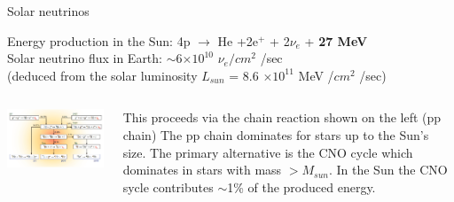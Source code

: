 \begin{frame}[t]{Solar neutrinos}
\begin{center}
Energy production in the Sun:  {\color{red} 4p $\rightarrow$ He
  +2e$^{+}$ + 2$\nu_{e}$} + {\bf \color{blue} 27 MeV}\\
    Solar neutrino flux in Earth: {\color{red}$\sim$6$\times10^{10}$ $\nu_{e} /cm^{2}$ /sec}\\
   (deduced from the solar luminosity $L_{sun}$ = 8.6 $\times 10^{11}$ MeV /$cm^{2}$ /sec)\\
\end{center}
\vspace{0.1cm}
\begin{columns}
  \begin{column}{0.70\textwidth}
    \includegraphics[width=0.99\textwidth]{./images/3nu/solar/pp_chain.png}\\
  \end{column}
  \begin{column}{0.30\textwidth}
   \centering
   {\scriptsize
   This proceeds via the chain reaction shown on the left (pp chain)
   The pp chain dominates for stars up to the Sun's size.
   The primary alternative is the CNO cycle which dominates in stars
   with mass $> M_{sun}$.
   In the Sun the CNO sycle contributes $\sim$1\% of the produced
   energy.\\
   }
  \end{column}
\end{columns}
\end{frame}


